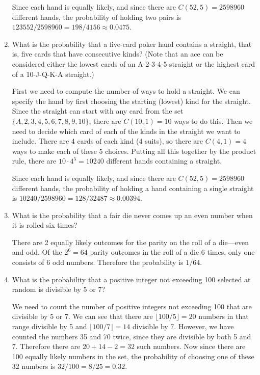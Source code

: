 \documentclass[11pt]{article}
\begin{document}
\begin{enumerate}[label=\textbf{\arabic*.}]
	Since each hand is equally likely, and since there are $C(52, 5) = 2598960$ different hands, the probability of holding two pairs is $123552 / 2598960 = 198 / 4156 \approx 0.0475$.
	
	\item What is the probability that a five-card poker hand contains a straight, that is, five cards that have consecutive kinds? (Note that an ace can be considered either the lowest cards of an A-2-3-4-5 straight or the highest card of a 10-J-Q-K-A straight.)
	
	First we need to compute the number of ways to hold a straight. We can specify the hand by first choosing the starting (lowest) kind for the straight. Since the straight can start with any card from the set $\{A, 2, 3, 4, 5, 6, 7, 8, 9, 10\}$, there are $C(10, 1) = 10$ ways to do this. Then we need to decide which card of each of the kinds in the straight we want to include. There are 4 cards of each kind (4 suits), so there are $C(4, 1) = 4$ ways to make each of these 5 choices. Putting all this together by the product rule, there are $10 \cdot 4^5 = 10240$ different hands containing a straight.
	
	Since each hand is equally likely, and since there are $C(52, 5) = 2598960$ different hands, the probability of holding a hand containing a single straight is $10240 / 2598960 = 128 / 32487 \approx 0.00394$.
	
	\item What is the probability that a fair die never comes up an even number when it is rolled six times?
	
	There are 2 equally likely outcomes for the parity on the roll of a die---even and odd. Of the $2^6 = 64$ parity outcomes in the roll of a die 6 times, only one consists of 6 odd numbers. Therefore the probability is $1 / 64$.
	
	\item What is the probability that a positive integer not exceeding 100 selected at random is divisible by 5 or 7?
	
	We need to count the number of positive integers not exceeding 100 that are divisible by 5 or 7. We can see that there are $\lfloor 100 / 5 \rfloor = 20$ numbers in that range divisible by 5 and $\lfloor 100 / 7 \rfloor = 14$ divisible by 7. However, we have counted the numbers 35 and 70 twice, since they are divisible by both 5 and 7. Therefore there are $20 + 14 - 2 = 32$ such numbers. Now since there are 100 equally likely numbers in the set, the probability of choosing one of these 32 numbers is $32 / 100 = 8 / 25 = 0.32$.
	

\end{enumerate}
\end{document}
